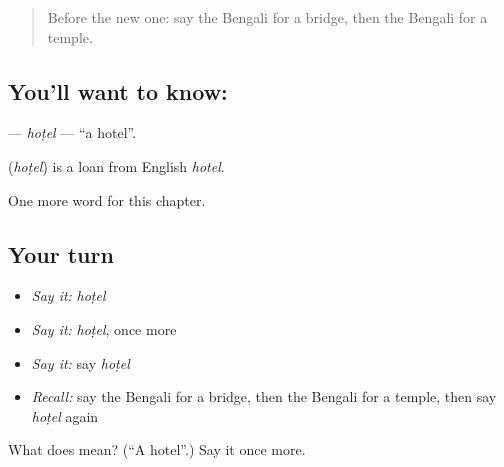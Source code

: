 \label{lesson:BN-C83-hotel}



\begin{quote}
Before the new one: say the Bengali for a bridge, then the Bengali for a temple.
\end{quote}

\subsection*{You'll want to know: }
\textbf{} — \emph{hoṭel} — \textquotedblleft{}a hotel\textquotedblright{}.

\begin{cousinweb}
\textbf{} (\emph{hoṭel}) is a loan from English \emph{hotel}.
\end{cousinweb}

\begin{grammarlens}[title={What you've built}]
One more word for this chapter.
\end{grammarlens}

\subsection*{Your turn}
\begin{itemize}
\raggedright
  \item \emph{Say it:} \emph{hoṭel}
  \item \emph{Say it:} \emph{hoṭel}, once more
  \item \emph{Say it:} say \emph{hoṭel}
  \item \emph{Recall:} say the Bengali for a bridge, then the Bengali for a temple, then say \emph{hoṭel} again
\end{itemize}

\begin{tcolorbox}[breakable,colback=teal!4,colframe=teal!35!black,title={Before you move on}]
What does  mean? (\textquotedblleft{}A hotel\textquotedblright{}.) Say it once more.
\end{tcolorbox}
